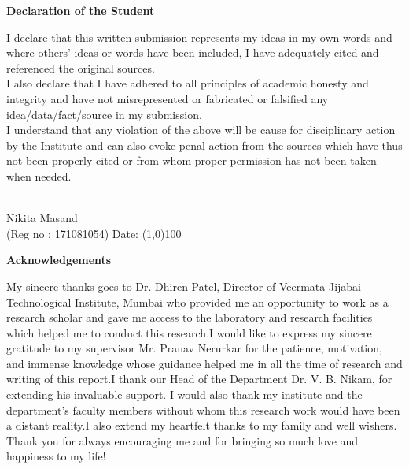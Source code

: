 \documentclass[letterpaper,12pt,oneside]{report}
\begin{document}
\vspace*{3\baselineskip}
\begin{center}\begin{Huge}\textbf{Declaration of the Student}\end{Huge}\end{center}
\vspace*{2\baselineskip}
\begin{Large}
I declare that this written submission represents my ideas in my own words and where others' ideas or words have been included, I have adequately cited and referenced the original sources.\\

I also declare that I have adhered to all principles of academic honesty and integrity and have not misrepresented or fabricated or falsified any idea/data/fact/source in my submission.\\

I understand that any violation of the above will be cause for disciplinary action by the Institute and can also evoke penal action from the sources which have thus not been properly cited or from whom proper permission has not been taken when needed.
\end{Large}
\vspace*{8\baselineskip}
\\Nikita Masand \\
\hspace{0.5in}(Reg no : 171081054)   \hspace{2.5in} Date: \line(1,0){100}
\newpage
\begin{centering}
\Huge{
\textbf{Acknowledgements}\\
}
\vspace{5mm}
\end{centering}
\begin{Large}
My sincere thanks goes to Dr. Dhiren Patel, Director of Veermata Jijabai Technological Institute, Mumbai who provided me an opportunity to work as a research scholar and gave me access to the laboratory and research facilities which helped me to conduct this research.I would like to express my sincere gratitude to my supervisor Mr. Pranav Nerurkar for the patience, motivation, and immense knowledge whose guidance helped me in all the time of research and writing of this report.I thank our Head of the Department Dr.  V. B. Nikam, for extending his invaluable support.  I would also thank my institute and the department’s faculty members without whom this research work would have been a distant reality.I also extend my heartfelt thanks to my family and well wishers. Thank you for always encouraging
me and for bringing so much love and happiness to my life!

\end{Large}
\end{document}
